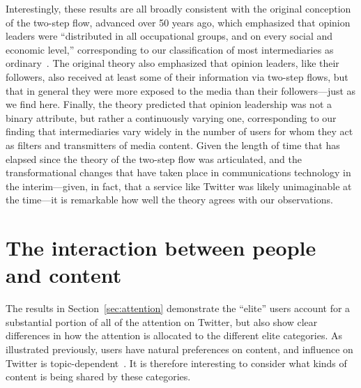\documentclass[phd,tocprelim]{cornell}
\renewcommand{\caption}[1]{\singlespacing\hangcaption{#1}\normalspacing}
\begin{document}
Interestingly, these results are all broadly consistent with the original
conception of the two-step flow, advanced over 50 years ago, which
emphasized that opinion leaders were ``distributed in all occupational
groups, and on every social and economic level,'' corresponding to our
classification of most intermediaries as
ordinary~\cite{katz_lazarsfeld}. The original theory also emphasized that
opinion leaders, like their followers, also received at least some of their
information via two-step flows, but that in general they were more exposed
to the media than their followers---just as we find here. Finally, the
theory predicted that opinion leadership was not a binary attribute, but
rather a continuously varying one, corresponding to our finding that
intermediaries vary widely in the number of users for whom they act as
filters and transmitters of media content.  Given the length of time that
has elapsed since the theory of the two-step flow was articulated, and the
transformational changes that have taken place in communications technology
in the interim---given, in fact, that a service like Twitter was likely
unimaginable at the time---it is remarkable how well the theory agrees with
our observations.

\section{The interaction between people and content}
\label{sec:interaction}
The results in Section~\ref{sec:attention} demonstrate the ``elite'' users
account for a substantial portion of all of the attention on Twitter, but
also show clear differences in how the attention is allocated to the
different elite categories. As illustrated previously, users have natural preferences on content, and influence on Twitter is topic-dependent~\cite{Leskovec-EC-2006,Cha-2010}. It is therefore interesting to consider what
kinds of content is being shared by these categories. 
\end{document}
